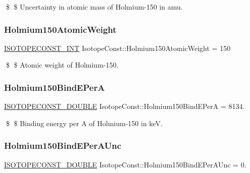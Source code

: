 \$ \$ Uncertainty in atomic mass of Holmium-\/150 in amu. \mbox{\label{group___isotope_const-_holmium-_ho150_ga3181ee48b2689998b1edfa5434ff9c16}} 
\subsubsection{\texorpdfstring{Holmium150\+Atomic\+Weight}{Holmium150AtomicWeight}}
{\footnotesize\ttfamily \mbox{\hyperlink{group___isotope_const-_macros_ga5f18360b3e99483a35c32d789e62621c}{I\+S\+O\+T\+O\+P\+E\+C\+O\+N\+S\+T\+\_\+\+I\+NT}} Isotope\+Const\+::\+Holmium150\+Atomic\+Weight = 150}

\$ \$ Atomic weight of Holmium-\/150. \mbox{\label{group___isotope_const-_holmium-_ho150_gaaaa587e690df4c81ab3866d3d286f98b}} 
\subsubsection{\texorpdfstring{Holmium150\+Bind\+E\+PerA}{Holmium150BindEPerA}}
{\footnotesize\ttfamily \mbox{\hyperlink{group___isotope_const-_macros_ga8f45a7272ce02c0b4c65c44636ed719a}{I\+S\+O\+T\+O\+P\+E\+C\+O\+N\+S\+T\+\_\+\+D\+O\+U\+B\+LE}} Isotope\+Const\+::\+Holmium150\+Bind\+E\+PerA = 8134.}

\$ \$ Binding energy per A of Holmium-\/150 in keV. \mbox{\label{group___isotope_const-_holmium-_ho150_ga87f44e2eb2678991f24521642c923096}} 
\subsubsection{\texorpdfstring{Holmium150\+Bind\+E\+Per\+A\+Unc}{Holmium150BindEPerAUnc}}
{\footnotesize\ttfamily \mbox{\hyperlink{group___isotope_const-_macros_ga8f45a7272ce02c0b4c65c44636ed719a}{I\+S\+O\+T\+O\+P\+E\+C\+O\+N\+S\+T\+\_\+\+D\+O\+U\+B\+LE}} Isotope\+Const\+::\+Holmium150\+Bind\+E\+Per\+A\+Unc = 0.}

